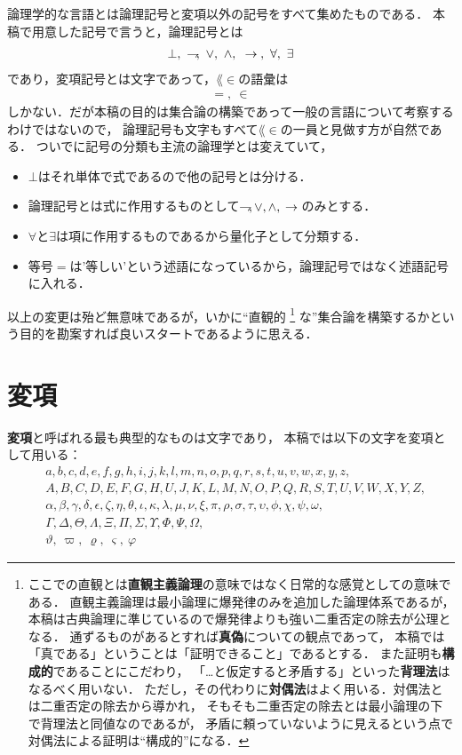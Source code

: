 	論理学的な言語とは論理記号と変項以外の記号をすべて集めたものである．
	本稿で用意した記号で言うと，論理記号とは
	\begin{align}
		\bot,\ \rightharpoondown\hspace{-0.25em},\ \vee,\ \wedge,\ \hspace{0.25em}\rightarrow\hspace{0.25em},\ \forall,\ \exists
	\end{align}
	であり，変項記号とは文字であって，$\lang{\in}$の語彙は
	\begin{align}
		=,\ \in
	\end{align}
	しかない．だが本稿の目的は集合論の構築であって一般の言語について考察するわけではないので，
	論理記号も文字もすべて$\lang{\in}$の一員と見做す方が自然である．
	ついでに記号の分類も主流の論理学とは変えていて，
	\begin{itemize}
		\item $\bot$はそれ単体で式であるので他の記号とは分ける．
		\item 論理記号とは式に作用するものとして$\rightharpoondown\hspace{-0.25em},\vee,\wedge,\hspace{0.25em}\rightarrow\hspace{0.25em}$のみとする．
		\item $\forall$と$\exists$は項に作用するものであるから量化子として分類する．
		\item 等号$=$は'等しい'という述語になっているから，論理記号ではなく述語記号に入れる．
	\end{itemize}
	以上の変更は殆ど無意味であるが，いかに``直観的
	\footnote{
		ここでの直観とは{\bf 直観主義論理}の意味ではなく日常的な感覚としての意味である．
		直観主義論理は最小論理に爆発律のみを追加した論理体系であるが，
		本稿は古典論理に準じているので爆発律よりも強い二重否定の除去が公理となる．
		通ずるものがあるとすれば{\bf 真偽}についての観点であって，
		本稿では「真である」ということは「証明できること」であるとする．
		また証明も{\bf 構成的}であることにこだわり，
		「…と仮定すると矛盾する」といった{\bf 背理法}はなるべく用いない．
		ただし，その代わりに{\bf 対偶法}はよく用いる．対偶法とは二重否定の除去から導かれ，
		そもそも二重否定の除去とは最小論理の下で背理法と同値なのであるが，
		矛盾に頼っていないように見えるという点で対偶法による証明は``構成的''になる．
	}
	な''集合論を構築するかという目的を勘案すれば良いスタートであるように思える．
	
\section{変項}
\label{sec:variables}
	{\bf 変項}と呼ばれる最も典型的なものは文字であり，
	本稿では以下の文字を変項として用いる：
	\begin{align}
		&a,b,c,d,e,f,g,h,i,j,k,l,m,n,o,p,q,r,s,t,u,v,w,x,y,z, \\
		&A,B,C,D,E,F,G,H,U,J,K,L,M,N,O,P,Q,R,S,T,U,V,W,X,Y,Z, \\
		&\alpha,\beta,\gamma,\delta,\epsilon,\zeta,\eta,\theta,\iota,
			\kappa,\lambda,\mu,\nu,\xi,\pi,\rho,\sigma,\tau,\upsilon,
			\phi,\chi,\psi,\omega, \\
		&\Gamma,\Delta,\Theta,\Lambda,\Xi,\Pi,\Sigma,\Upsilon,\Phi,\Psi,\Omega, \\
		&\vartheta,\ \varpi,\ \varrho,\ \varsigma,\ \varphi
	\end{align}
	
